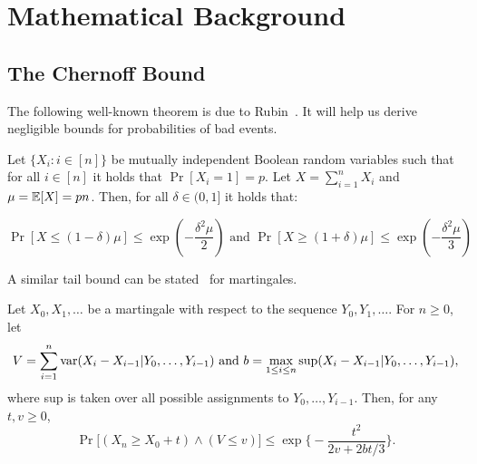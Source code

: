 \section{Mathematical Background}
\subsection{The Chernoff Bound}

The following well-known theorem is due to
Rubin~\cite{chernoff1952measure,chernoff2014career}. It will help us derive
negligible bounds for probabilities of bad events.

\begin{theorem}
  Let $\{X_i: i \in [n]\}$ be mutually independent Boolean random variables
  such that for all $i \in [n]$ it holds that $\Pr[X_i = 1] = p$. Let
  $X = \sum_{i = 1}^n X_i$ and $\mu = \operatorname{\mathbb{E}}[X] = pn$. Then, for all
  $\delta \in (0, 1]$ it holds that:

  \[
    \Pr[X \leq (1 - \delta)\mu] \leq \exp(-\frac{\delta^2\mu}{2})
    \text{ and }
    \Pr[X \geq (1 + \delta)\mu] \leq \exp(-\frac{\delta^2\mu}{3})
  \]
\end{theorem}

A similar tail bound can be stated~\cite[Theorem~3.15]{mcdiarmid1998} for martingales.

\begin{theorem}
\label{theorem:tailbound}
	Let $X_0,X_1,\dots$ be a martingale with respect to the sequence
	$Y_0,Y_1,\dots$.
	For $n\ge0$, let
	\[
		V=\sum_{i=1}^n\mathrm{var}(X_i-X_{i-1}|Y_0,\dots,Y_{i-1})
		\hbox{~and~}
		b=\max_{1\leq i\leq n}\sup(X_i-X_{i-1}|Y_0,\dots,Y_{i-1})
	,\]
	where sup is taken over all possible assignments to $Y_0,\dots,Y_{i-1}$.
	Then, for any $t,v\ge0$,
	\[\Pr\bigl[(X_n\ge X_0+t)\wedge(V\leq v)\bigr]\le\exp\biggl\{-\frac{t^2}{2v+2bt/3}\biggr\}.\]
\end{theorem}
